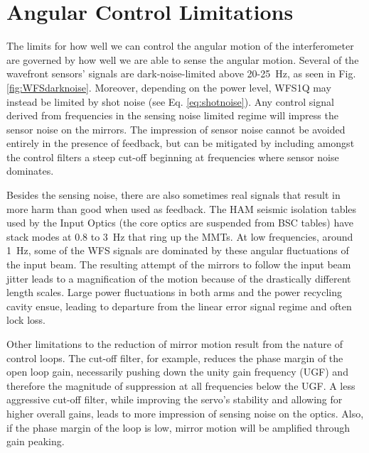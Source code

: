 \section{Angular Control Limitations}
\label{sec:ASClimits}
The limits for how well we can control the angular motion of the interferometer are governed by how well we are able to sense the angular motion. Several of the wavefront sensors' signals are dark-noise-limited above 20-25~Hz, as seen in Fig. \ref{fig:WFSdarknoise}. Moreover, depending on the power level, WFS1Q may instead be limited by shot noise (see Eq. \ref{eq:shotnoise}). Any control signal derived from frequencies in the sensing noise limited regime will impress the sensor noise on the mirrors. The impression of sensor noise cannot be avoided entirely in the presence of feedback, but can be mitigated by including amongst the control filters a steep cut-off beginning at frequencies where sensor noise dominates. 

Besides the sensing noise, there are also sometimes real signals that result in more harm than good when used as feedback. The HAM seismic isolation tables used by the Input Optics (the core optics are suspended from BSC tables) have stack modes at 0.8 to 3~Hz that ring up the MMTs.  At low frequencies, around 1~Hz, some of the WFS signals are dominated by these angular fluctuations of the input beam. The resulting attempt of the mirrors to follow the input beam jitter leads to a magnification of the motion because of the drastically different length scales. Large power fluctuations in both arms and the power recycling cavity ensue, leading to departure from the linear error signal regime and often lock loss. 

Other limitations to the reduction of mirror motion result from the nature of control loops. The cut-off filter, for example, reduces the phase margin of the open loop gain, necessarily pushing down the unity gain frequency (UGF) and therefore the magnitude of suppression at all frequencies below the UGF. A less aggressive cut-off filter, while improving the servo's stability and allowing for higher overall gains, leads to more impression of sensing noise on the optics. Also, if the phase margin of the loop is low, mirror motion will be amplified through gain peaking.





